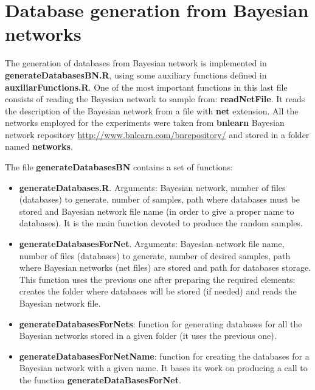 \documentclass[11pt,professionalfont]{article}
\begin{document}
\section{Database generation from Bayesian networks}

The generation of databases from Bayesian network is implemented in 
\textbf{generateDatabasesBN.R}, using some auxiliary functions defined in 
\textbf{auxiliarFunctions.R}. One of the most important functions in this last file 
consists of reading the Bayesian network to sample from:  \textbf{readNetFile}. It 
reads the description of the Bayesian network from a  file with \textbf{net} extension. 
All the networks employed for the experiments were taken from \textbf{bnlearn} Bayesian 
network repository \url{http://www.bnlearn.com/bnrepository/} and stored in a folder named
\textbf{networks}. 

\medskip

The file \textbf{generateDatabasesBN} contains a set of functions:

\begin{itemize}
\item \textbf{generateDatabases.R}. Arguments: Baye\-sian network,  number
of files (databases) to generate, number of samples, path where databases
must be stored and Baye\-sian network file name (in order to give a proper name
to databases). It is the main function devoted to produce the random samples.

\item \textbf{generateDatabasesForNet}. Arguments: Bayesian network file
name, number of files (databases) to generate, number of desired samples, path
where Baye\-sian networks (net files) are stored and path for databases storage.
This function uses the previous one after preparing the required elements:
creates the folder where databases will be stored (if needed) and reads the
Bayesian network file.

\item \textbf{generateDatabasesForNets}: function for generating databases 
for all the Baye\-sian networks stored in a given folder (it uses the previous
one).

\item \textbf{generateDatabasesForNetName}: function for creating the
databases for a Baye\-sian network with a given name. It bases its work on 
producing a call to the function \textbf{generateData\-Bases\-ForNet}. 

\end{itemize}
\end{document}
